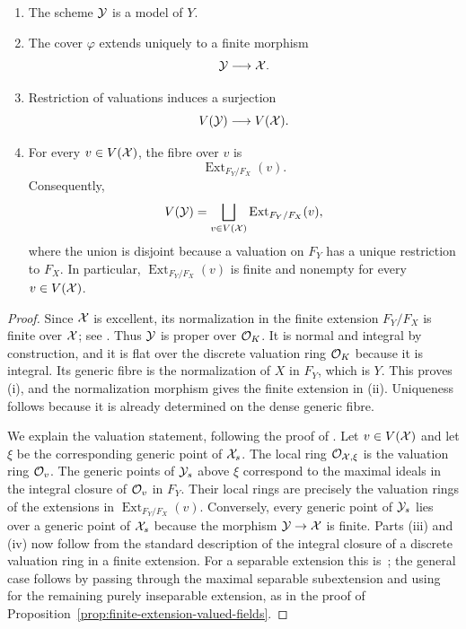 \begin{proposition}\label{prop:normalization-extension-valuations}
    \begin{enumerate}[label=\textup{(\roman*)}]
        \item The scheme $\mathcal Y$ is a model of $Y$.
        \item The cover $\varphi$ extends uniquely to a finite morphism
        \[
            \mathcal Y\longrightarrow\mathcal X.
        \]
        \item Restriction of valuations induces a surjection
        \[
            V(\mathcal Y)\longrightarrow V(\mathcal X).
        \]
        \item For every $v\in V(\mathcal X)$, the fibre over $v$ is
        \[
            \operatorname{Ext}_{F_Y/F_X}(v).
        \]
        Consequently,
        \[
            V(\mathcal Y)
            =
            \bigsqcup_{v\in V(\mathcal X)}
            \operatorname{Ext}_{F_Y/F_X}(v),
        \]
        where the union is disjoint because a valuation on $F_Y$ has a unique restriction to $F_X$.
        In particular, $\operatorname{Ext}_{F_Y/F_X}(v)$ is finite and nonempty for every $v\in V(\mathcal X)$.
    \end{enumerate}
\end{proposition}

\begin{proof}
    Since $\mathcal X$ is excellent, its normalization in the finite extension $F_Y/F_X$ is finite over $\mathcal X$; see \cite[Theorem 8.2.39(d)]{Liu}.
    Thus $\mathcal Y$ is proper over $\mathcal O_K$.
    It is normal and integral by construction, and it is flat over the discrete valuation ring $\mathcal O_K$ because it is integral.
    Its generic fibre is the normalization of $X$ in $F_Y$, which is $Y$.
    This proves (i), and the normalization morphism gives the finite extension in (ii).
    Uniqueness follows because it is already determined on the dense generic fibre.

    We explain the valuation statement, following the proof of \cite[Proposition 5.2]{Rueth}.
    Let $v\in V(\mathcal X)$ and let $\xi$ be the corresponding generic point of $\mathcal X_s$.
    The local ring $\mathcal{O}_{\mathcal X,\xi}$ is the valuation ring $\mathcal{O}_v$.
    The generic points of $\mathcal Y_s$ above $\xi$ correspond to the maximal ideals in the integral closure of $\mathcal{O}_v$ in $F_Y$.
    Their local rings are precisely the valuation rings of the extensions in $\operatorname{Ext}_{F_Y/F_X}(v)$.
    Conversely, every generic point of $\mathcal Y_s$ lies over a generic point of $\mathcal X_s$ because the morphism $\mathcal Y\to\mathcal X$ is finite.
    Parts (iii) and (iv) now follow from the standard description of the integral closure of a discrete valuation ring in a finite extension.
    For a separable extension this is~\cite[\href{https://stacks.math.columbia.edu/tag/0EXQ}{Remark 15.113.6}]{Stacks}; the general case follows by passing through the maximal separable subextension and using~\cite[\href{https://stacks.math.columbia.edu/tag/0H37}{Lemma 15.123.3}]{Stacks} for the remaining purely inseparable extension, as in the proof of Proposition~\ref{prop:finite-extension-valued-fields}.
\end{proof}

